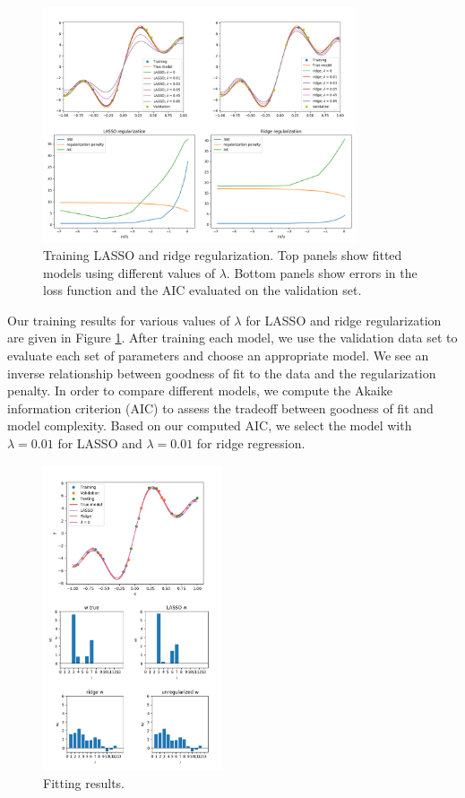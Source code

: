 \documentclass[10pt]{article}
\begin{document}
\begin{figure}
\caption{Training LASSO and ridge regularization. Top panels show fitted models using different values of $\lambda$. Bottom panels show errors in the loss function and the AIC evaluated on the validation set.}
\begin{center}
\includegraphics[width=350px]{all_training}
\end{center}
\label{fig:train_lasso}
\end{figure}

Our training results for various values of $\lambda$ for LASSO and ridge regularization are given in Figure \ref{fig:train_lasso}. After training each model, we use the validation data set to evaluate each set of parameters and choose an appropriate model. We see an inverse relationship between goodness of fit to the data and the regularization penalty. In order to compare different models, we compute the Akaike information criterion (AIC) to assess the tradeoff between goodness of fit and model complexity. Based on our computed AIC, we select the model with $\lambda=0.01$ for LASSO and $\lambda=0.01$ for ridge regression.

\begin{figure}
\caption{Fitting results.}
\begin{center}
\includegraphics[width=200px]{final_fitting_results}
\end{center}
\label{fig:final_lasso_test}
\end{figure}
\end{document}
